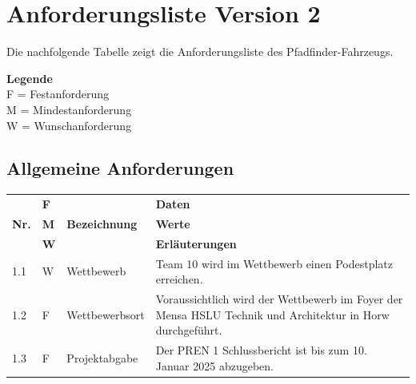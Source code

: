 \documentclass[../main.tex]{subfiles}
\begin{document}
\section{Anforderungsliste Version 2}

Die nachfolgende Tabelle zeigt die Anforderungsliste des Pfadfinder-Fahrzeugs.

\textbf{Legende} \\ F = Festanforderung \\ M = Mindestanforderung \\ W = Wunschanforderung

\subsection{Allgemeine Anforderungen}

\begin{tabular}{|l|p{0.5cm}|p{4cm}|p{10cm}|}
  \hline
               & \textbf{F} &                      & \textbf{Daten}                                                                                                                                                                                                               \\
  \textbf{Nr.} & \textbf{M} & \textbf{Bezeichnung} & \textbf{Werte}                                                                                                                                                                                                               \\
               & \textbf{W} &                      & \textbf{Erläuterungen}                                                                                                                                                                                                       \\
  \hline
  1.1          & W          & Wettbewerb           & Team 10 wird im Wettbewerb einen Podestplatz erreichen.                                                                                                                                                                      \\
  \hline
  1.2          & F          & Wettbewerbsort       & Voraussichtlich wird der Wettbewerb im Foyer der Mensa HSLU Technik und Architektur in Horw durchgeführt.                                                                                                                    \\
  \hline
  1.3          & F          & Projektabgabe        & Der PREN 1 Schlussbericht ist bis zum 10. Januar 2025 abzugeben.                                                                                                                                                             \\

\end{tabular}
\end{document}
